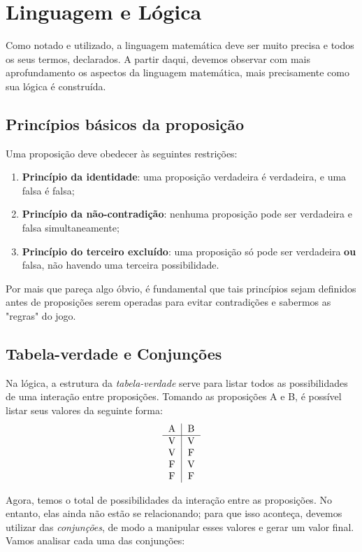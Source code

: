 \documentclass{article}
\begin{document}
\section{Linguagem e Lógica}
Como notado e utilizado, a linguagem matemática deve ser muito precisa e todos os seus termos, declarados. A partir daqui, devemos observar com mais aprofundamento os aspectos da linguagem matemática, mais precisamente como sua lógica é construída.
\subsection{Princípios básicos da proposição}
Uma proposição deve obedecer às seguintes restrições:
\begin{enumerate}
    \item \textbf{Princípio da identidade}: uma proposição verdadeira é verdadeira, e uma falsa é falsa;
    \item \textbf{Princípio da não-contradição}: nenhuma proposição pode ser verdadeira e falsa simultaneamente; 
    \item \textbf{Princípio do terceiro excluído}: uma proposição só pode ser verdadeira \textbf{ou} falsa, não havendo uma terceira possibilidade.
\end{enumerate}
Por mais que pareça algo óbvio, é fundamental que tais princípios sejam definidos antes de proposições serem operadas para evitar contradições e sabermos as "regras" do jogo.
\subsection{Tabela-verdade e Conjunções}
Na lógica, a estrutura da \emph{tabela-verdade} serve para listar todos as possibilidades de uma interação entre proposições. Tomando as proposições A e B, é possível listar seus valores da seguinte forma: \\
\begin{align*}
\begin{tabular}{c|c}
A & B \\
\hline
V & V \\
V & F \\
F & V \\
F & F \\
\end{tabular}
\end{align*}

Agora, temos o total de possibilidades da interação entre as proposições. No entanto, elas ainda não estão se relacionando; para que isso aconteça, devemos utilizar das \emph{conjunções}, de modo a manipular esses valores e gerar um valor final. Vamos analisar cada uma das conjunções:
\end{document}
